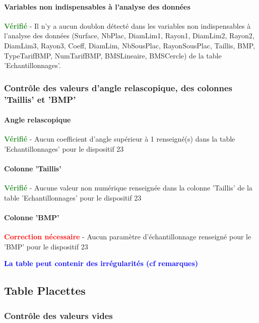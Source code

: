 \documentclass[a4paper]{article}
\begin{document}
\paragraph{Variables non indispensables à l'analyse des données}
\textcolor{ForestGreen}{\textbf{Vérifié}} - Il n'y a aucun doublon détecté dans les variables non indispensables à l'analyse des données (Surface, NbPlac, DiamLim1, Rayon1, DiamLim2, Rayon2, DiamLim3, Rayon3, Coeff, DiamLim, NbSousPlac, RayonSousPlac, Taillis, BMP, TypeTarifBMP, NumTarifBMP, BMSLineaire, BMSCercle) de la table 'Echantillonnages'. \\ 

\subsubsection{Contrôle des valeurs d'angle relascopique, des colonnes 'Taillis' et 'BMP'}
\paragraph{Angle relascopique}\textcolor{ForestGreen}{\textbf{Vérifié}} - Aucun coefficient d'angle supérieur à 1 renseigné(s) dans la table 'Echantillonnages' pour le dispositif 23\\
\paragraph{Colonne 'Taillis'}\textcolor{ForestGreen}{\textbf{Vérifié}} - Aucune valeur non numérique renseignée dans la colonne 'Taillis' de la table 'Echantillonnages' pour le dispositif 23\\
\paragraph{Colonne 'BMP'}\textcolor{Red}{\textbf{Correction nécessaire}} - Aucun paramètre d'échantillonnage renseigné pour le 'BMP' pour le dispositif 23\\
\FloatBarrier\begin{center}
\textcolor{Blue}{\textbf{La table peut contenir des irrégularités (cf remarques)}}
\end{center}


\FloatBarrier

\subsection{Table Placettes}
\subsubsection{Contrôle des valeurs vides}
\end{document}
